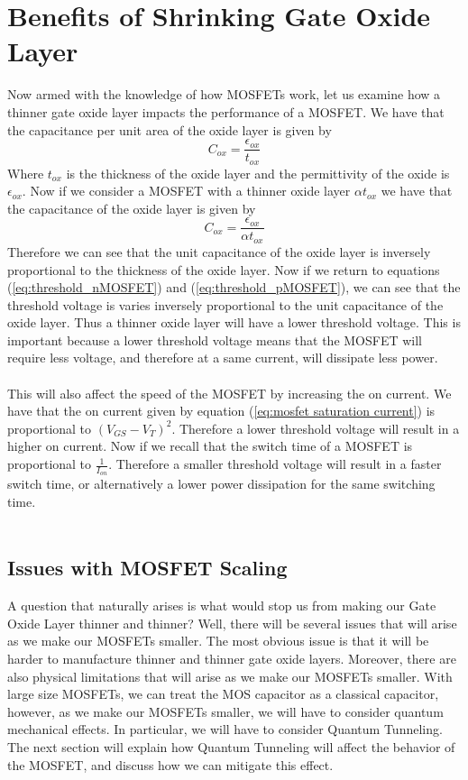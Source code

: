\documentclass[
  reprint,
  amsmath,amssymb,
  aps
]{revtex4-1}
\begin{document}
\section{\label{sec:level1} Benefits of Shrinking Gate Oxide Layer}
Now armed with the knowledge of how MOSFETs work, let us examine how a thinner 
gate oxide layer impacts the performance of a MOSFET. We have that the capacitance per unit area of the oxide layer is given by
\begin{equation}
  C_{ox} = \frac{\epsilon_{ox}}{t_{ox}}
\end{equation}
Where $t_{ox}$ is the thickness of the oxide layer and the permittivity of the oxide is $\epsilon_{ox}$.
Now if we consider a MOSFET with a thinner oxide layer $\alpha t_{ox}$ we 
have that the capacitance of the oxide layer is given by
\begin{equation}
  C_{ox} = \frac{\epsilon_{ox}}{\alpha t_{ox}}
\end{equation}
Therefore we can see that the unit capacitance of the oxide layer is inversely proportional to the thickness of the oxide layer. Now if we return to 
equations (\ref{eq:threshold_nMOSFET}) and (\ref{eq:threshold_pMOSFET}), we can see that the threshold voltage is varies inversely proportional to the unit capacitance of the oxide layer. 
Thus a thinner oxide layer will have a lower threshold voltage. This is important because a lower threshold voltage means that the MOSFET will require less voltage, and therefore 
at a same current, will dissipate less power.\cite{ChenmingHu6}\\\\
This will also affect the speed of the MOSFET by increasing the on current. We have that the on current given by 
equation (\ref{eq:mosfet saturation current}) is proportional to $(V_{GS}-V_{T})^{2}$. Therefore a lower threshold voltage will result in 
a higher on current. Now if we recall that the switch time of a MOSFET is proportional to $\frac{1}{I_{on}}$. Therefore 
a smaller threshold voltage will result in a faster switch time, or alternatively a lower power dissipation for the 
same switching time.\cite{ChenmingHu6}\\\\
\subsection{\label{sec:level2}Issues with MOSFET Scaling}
A question that naturally arises is what would stop us from making our Gate Oxide Layer thinner and thinner? Well, there will be several issues that will 
arise as we make our MOSFETs smaller. The most obvious issue is that it will be harder to manufacture thinner 
and thinner gate oxide layers. Moreover, there are also physical limitations that will arise as we make our MOSFETs smaller. With large size 
MOSFETs, we can treat the MOS capacitor as a classical capacitor, however, as we make our MOSFETs smaller, we will have to consider quantum mechanical effects. In particular, we will have to consider Quantum Tunneling. 
The next section will explain how Quantum Tunneling will affect the behavior of the MOSFET, and discuss 
how we can mitigate this effect.
\end{document}
